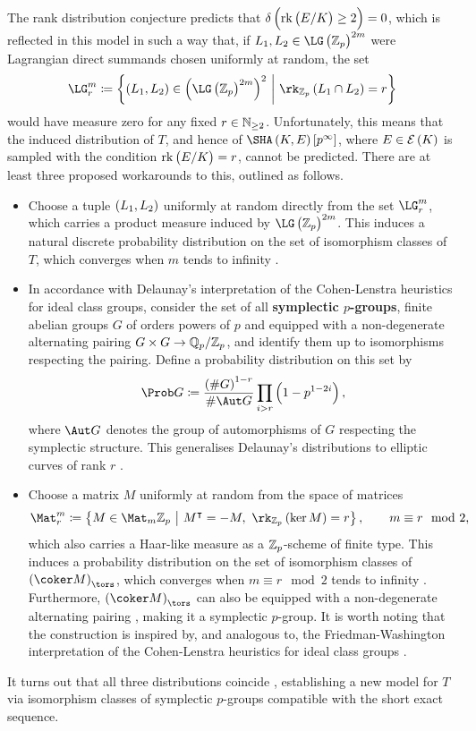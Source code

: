 The rank distribution conjecture predicts that $ \delta\br{\rkE \ge 2} = 0 $, which is reflected in this model in such a way that, if $ L_1, L_2 \in \LG\br{\ZZ_p}^{2m} $ were Lagrangian direct summands chosen uniformly at random, the set
$$ \LG_r^m \coloneqq \cbr{\br{L_1, L_2} \in \br{\LG\br{\ZZ_p}^{2m}}^2 \st \rk_{\ZZ_p} \br{L_1 \cap L_2} = r} $$
would have measure zero for any fixed $ r \in \mathbb{N}_{\ge 2} $. Unfortunately, this means that the induced distribution of $ T $, and hence of $ \Sha\sbr{p^\infty} $, where $ E \in \EEE\br{K} $ is sampled with the condition $ \rkE = r $, cannot be predicted. There are at least three proposed workarounds to this, outlined as follows.
\begin{itemize}
\item Choose a tuple $ \br{L_1, L_2} $ uniformly at random directly from the set $ \LG_r^m $, which carries a product measure induced by $ \LG\br{\ZZ_p}^{2m} $. This induces a natural discrete probability distribution on the set of isomorphism classes of $ T $, which converges when $ m $ tends to infinity \cite[Theorem 1.6]{BKLPR15}.
\item In accordance with Delaunay's interpretation of the Cohen-Lenstra heuristics for ideal class groups, consider the set of all \textbf{symplectic $ p $-groups}, finite abelian groups $ G $ of orders powers of $ p $ and equipped with a non-degenerate alternating pairing $ G \times G \to \mathbb{Q}_p / \mathbb{Z}_p $, and identify them up to isomorphisms respecting the pairing. Define a probability distribution on this set by
$$ \Prob G \coloneqq \dfrac{\br{\#G}^{1 - r}}{\#\Aut G}\prod_{i > r} \br{1 - p^{1 - 2i}}, $$
where $ \Aut G $ denotes the group of automorphisms of $ G $ respecting the symplectic structure. This generalises Delaunay's distributions to elliptic curves of rank $ r $ \cite[Section 5.6]{BKLPR15}.

\pagebreak

\item Choose a matrix $ M $ uniformly at random from the space of matrices
$$ \Mat_r^m \coloneqq \cbr{M \in \Mat_m \ZZ_p \st M^\intercal = -M, \ \rk_{\ZZ_p} \br{\ker M} = r}, \qquad m \equiv r \mod 2, $$
which also carries a Haar-like measure as a $ \mathbb{Z}_p $-scheme of finite type. This induces a probability distribution on the set of isomorphism classes of $ \br{\coker M}_{\tors} $, which converges when $ m \equiv r \mod 2 $ tends to infinity \cite[Theorem 1.10]{BKLPR15}. Furthermore, $ \br{\coker M}_{\tors} $ can also be equipped with a non-degenerate alternating pairing \cite[Section 3.5]{BKLPR15}, making it a symplectic $ p $-group. It is worth noting that the construction is inspired by, and analogous to, the Friedman-Washington interpretation of the Cohen-Lenstra heuristics for ideal class groups \cite[Remark 1.11]{BKLPR15}.
\end{itemize}
It turns out that all three distributions coincide \cite[Theorems 1.6(c) and 1.10(b)]{BKLPR15}, establishing a new model for $ T $ via isomorphism classes of symplectic $ p $-groups compatible with the short exact sequence.

